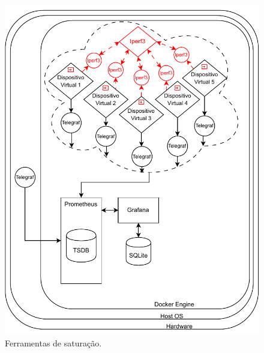 {%

}

\begin{figure}[H]
\centering
\includegraphics[scale=1]{Imagens/chap03/by-blocks/saturation_diagram.pdf}
\caption{Ferramentas de saturação.}
\label{fig:DiagramaSaturacao}
\end{figure}


